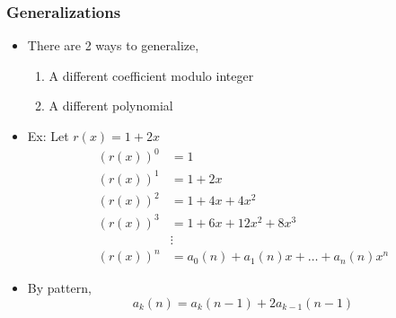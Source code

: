 \documentclass{beamer}
\begin{document}
\begin{frame}
    \frametitle{Generalizations}
    \begin{itemize}
        \item There are 2 ways to generalize,
        \begin{enumerate}
            \item A different coefficient modulo integer 
            \item A different polynomial
        \end{enumerate}
        \item Ex: Let $r(x) = 1+2x$
        \begin{align*}
            (r(x))^0 &= 1 \\
            (r(x))^1 &= 1+2x \\
            (r(x))^2 &= 1 + 4x + 4x^2\\
            (r(x))^3 &= 1 + 6x + 12x^2 + 8x^3 \\
            &\vdots \\
            (r(x))^n &= a_0(n) + a_1(n)x + \dots + a_n(n)x^n
        \end{align*}
        \item By pattern,
        \begin{equation*}
            a_k(n) = a_{k}(n-1) + 2a_{k-1}(n-1)
        \end{equation*}
    \end{itemize}
\end{frame}
\end{document}
